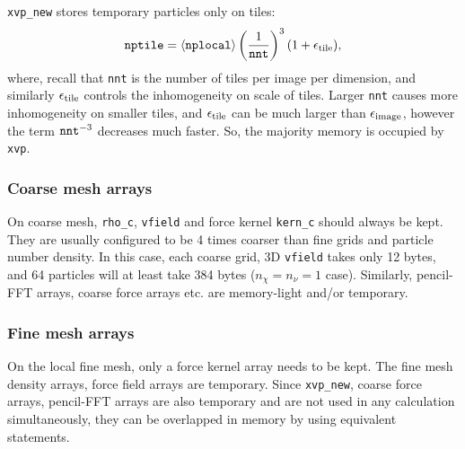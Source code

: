 \documentclass[10pt,twocolumn,preprint]{emulateapj}
\begin{document}
{\tt xvp\_new} stores temporary particles only on tiles:
\begin{equation}\label{eq.nptile}
	{\tt nptile}=\left\langle {\tt nplocal} \right\rangle \left( \frac{1}{\tt nnt} \right)^3(1+\epsilon_{\rm tile}),
\end{equation}
where, recall that {\tt nnt} is the number of tiles per image per dimension, and similarly $\epsilon_{\rm tile}$ controls the inhomogeneity on scale of tiles. Larger {\tt nnt} causes more inhomogeneity on smaller tiles, and $\epsilon_{\rm tile}$ can be much larger than $\epsilon_{\rm image}$, however the term ${\tt nnt}^{-3}$ decreases much faster. So, the majority memory is occupied by {\tt xvp}.

\subsubsection{Coarse mesh arrays}
On coarse mesh, {\tt rho\_c}, {\tt vfield} and force kernel {\tt kern\_c} should always be kept. They are usually configured to be 4 times coarser than fine grids and particle number density. In this case, each coarse grid, 3D {\tt vfield} takes only 12 bytes, and 64 particles will at least take 384 bytes ($n_\chi=n_\nu=1$ case). Similarly, pencil-FFT arrays, coarse force arrays etc. are memory-light and/or temporary.

\subsubsection{Fine mesh arrays}
On the local fine mesh, only a force kernel array needs to be kept. The fine mesh density arrays, force field arrays are temporary. Since {\tt xvp\_new}, coarse force arrays, pencil-FFT arrays are also temporary and are not used in any calculation simultaneously, they can be overlapped in memory by using equivalent statements.
\end{document}
